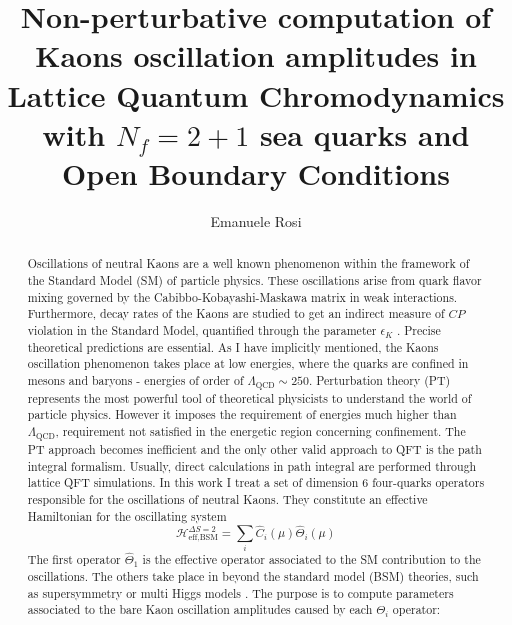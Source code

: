 \documentclass[english, LaM, oneside, noexaminfo]{sapthesis}
\title{Non-perturbative computation of Kaons oscillation amplitudes in Lattice Quantum Chromodynamics with $N_f = 2+1$ sea quarks and Open Boundary Conditions}
\author{Emanuele Rosi}
\newcommand{\mev}{\text{ MeV}}
\begin{document}
\frontmatter
\maketitle

\dedication{
    \hspace*{.76\textwidth}Ai miei genitori.
    \newline
    \newline
    \newline
    \newline
    A tutte quelle giornate in cui non mi stavo sacrificando per lo studio, stavo facendo ciò che amo.
}

\begin{abstract}
    Oscillations of neutral Kaons are a well known phenomenon within the framework of the Standard Model (SM) of particle physics.
    These oscillations arise from quark flavor mixing governed by the Cabibbo-Kobayashi-Maskawa matrix in weak interactions.
    Furthermore, decay rates of the Kaons are studied to get an indirect measure of $CP$ violation in the Standard Model, quantified through the parameter $\epsilon_K$ \cite{Branco-CPviolation}.
    Precise theoretical predictions are essential.
    As I have implicitly mentioned, the Kaons oscillation phenomenon takes place at low energies, where the quarks are confined in mesons and baryons - energies of order of $\Lambda_\text{QCD} \sim 250$\mev\space \cite{WeinbergII}.
    Perturbation theory (PT) represents the most powerful tool of theoretical physicists to understand the world of particle physics.
    However it imposes the requirement of energies much higher than $\Lambda_\text{QCD}$, requirement not satisfied in the energetic region concerning confinement.
    The PT approach becomes inefficient and the only other valid approach to QFT is the path integral formalism.
    Usually, direct calculations in path integral are performed through lattice QFT simulations.
    \newline
    In this work I treat a set of dimension 6 four-quarks operators responsible for the oscillations of neutral Kaons.
    They constitute an effective Hamiltonian for the oscillating system
    $$ \mathcal{H}^{\Delta S=2}_\text{eff,BSM} = \sum_i \hat C_i (\mu) \hat\Theta_i (\mu) $$
    The first operator $\hat\Theta_1$ is the effective operator associated to the SM contribution to the oscillations.
    The others take place in beyond the standard model (BSM) theories, such as supersymmetry or multi Higgs models \cite{Bparameters}.
    The purpose is to compute parameters associated to the bare Kaon oscillation amplitudes caused by each $\Theta_i$ operator:

\end{abstract}
\end{document}

